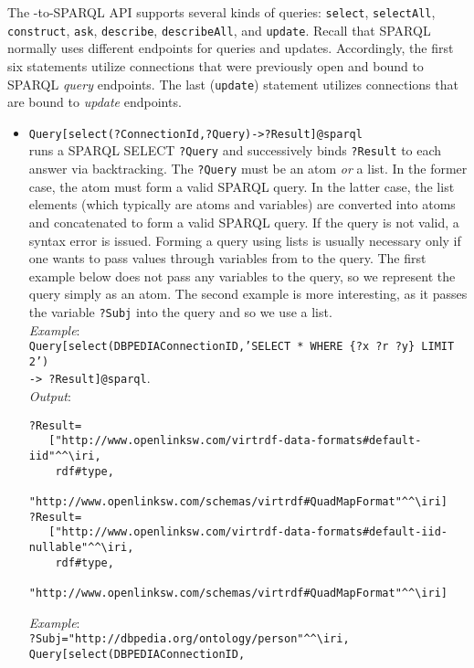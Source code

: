 The \ERGO-to-SPARQL API supports several kinds of queries:
 \texttt{select},
 \texttt{selectAll},
 \texttt{construct}, 
 \texttt{ask},
 \texttt{describe}, 
 \texttt{describeAll}, 
 and 
 \texttt{update}.   
 Recall that SPARQL normally uses different endpoints for queries and
 updates. Accordingly,
 the first six statements utilize connections that were previously open and
 bound to SPARQL \emph{query} endpoints. The last (\texttt{update})
 statement utilizes connections that are bound to \emph{update} endpoints.   
\begin{itemize}
\item  \texttt{Query[select(?ConnectionId,?Query)->?Result]@\bs{}sparql} 
  \\
  runs a SPARQL SELECT 
  \texttt{?Query} and successively binds \texttt{?Result} to each answer via
  backtracking. 
  The \texttt{?Query} must be an \ERGO atom \emph{or} a  list. In the former case,
  the atom must form a valid SPARQL query. In the
  latter case, the list elements (which typically are \ERGO 
  atoms and variables)
  are converted into atoms and concatenated
  to form a valid SPARQL query.
  If the query is not valid, a syntax error is issued.
  Forming a query using lists is usually necessary only if one wants to pass
  values through variables from \ERGO to the query. The first example below
  does not pass any
  variables to the query, so we represent the query simply as an atom.
  The second example is more interesting, as it passes the \ERGO variable
  \texttt{?Subj}   into
  the query and so we use a list.
  \\
  \emph{Example}: \\
  \texttt{Query[select(DBPEDIAConnectionID,'SELECT * WHERE \{?x ?r ?y\}
    LIMIT 2')\\\hspace*{2cm}
    -> ?Result]@\bs{}sparql}.
  \\
\emph{Output}:
\begin{verbatim}
?Result=
   ["http://www.openlinksw.com/virtrdf-data-formats#default-iid"^^\iri,
    rdf#type,
    "http://www.openlinksw.com/schemas/virtrdf#QuadMapFormat"^^\iri]
?Result=
   ["http://www.openlinksw.com/virtrdf-data-formats#default-iid-nullable"^^\iri,
    rdf#type,
    "http://www.openlinksw.com/schemas/virtrdf#QuadMapFormat"^^\iri]
\end{verbatim}
  \emph{Example}: \\
  \verb|?Subj="http://dbpedia.org/ontology/person"^^\iri,|
  \texttt{Query[select(DBPEDIAConnectionID,
    \\\hspace*{25mm}
}
\end{itemize}

